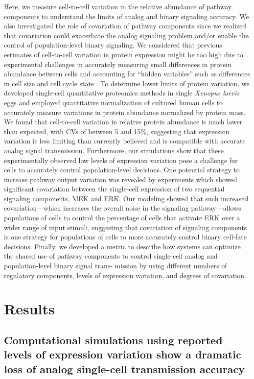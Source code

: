 Here, we measure cell-to-cell variation in the relative abundance of pathway components to understand the limits of analog and binary signaling accuracy. We also investigated the role of covariation of pathway components since we realized that covariation could exacerbate the analog signaling problem and/or enable the control of population-level binary signaling. We considered that previous estimates of cell-to-cell variation in protein expression might be too high due to experimental challenges in accurately measuring small differences in protein abundance between cells and accounting for “hidden variables” such as differences in cell size and cell cycle state \cite{Symmons2016}. To determine lower limits of protein variation, we developed single-cell quantitative proteomics methods in single \emph{Xenopus laevis} eggs and employed quantitative normalization of cultured human cells to accurately measure variations in protein abundance normalized by protein mass. We found that cell-to-cell variation in relative protein abundance is much lower than expected, with CVs of between 5 and 15\%, suggesting that expression variation is less limiting than currently believed and is compatible with accurate analog signal transmission. Furthermore, our simulations show that these experimentally observed low levels of expression variation pose a challenge for cells to accurately control population-level decisions. One potential strategy to increase pathway output variation was revealed by experiments which showed significant covariation between the single-cell expression of two sequential signaling components, MEK and ERK. Our modeling showed that such increased covariation—which increases the overall noise in the signaling pathway—allows populations of cells to control the percentage of cells that activate ERK over a wider range of input stimuli, suggesting that covariation of signaling components is one strategy for populations of cells to more accurately control binary cell-fate decisions. Finally, we developed a metric to describe how systems can optimize the shared use of pathway components to control single-cell analog and population-level binary signal trans- mission by using different numbers of regulatory components, levels of expression variation, and degrees of covariation.

\section{Results}
\subsection{Computational simulations using reported levels of expression variation show a dramatic loss of analog single-cell transmission accuracy}

